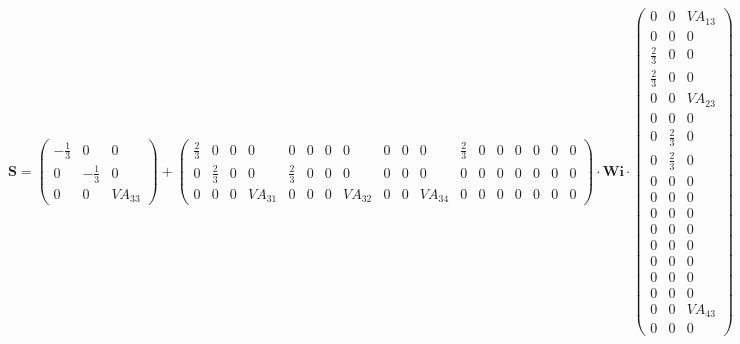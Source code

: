\[ \mathbf{S} = \left(\begin{smallmatrix} -\frac{1}{3} & 0 & 0 \\ 0 & -\frac{1}{3} & 0 \\ 0 & 0 & VA_{33} \end{smallmatrix}\right) + \left(\begin{smallmatrix} \frac{2}{3} & 0 & 0 & 0 & 0 & 0 & 0 & 0 & 0 & 0 & 0 & \frac{2}{3} & 0 & 0 & 0 & 0 & 0 & 0 \\ 0 & \frac{2}{3} & 0 & 0 & \frac{2}{3} & 0 & 0 & 0 & 0 & 0 & 0 & 0 & 0 & 0 & 0 & 0 & 0 & 0 \\ 0 & 0 & 0 & VA_{31} & 0 & 0 & 0 & VA_{32} & 0 & 0 & VA_{34} & 0 & 0 & 0 & 0 & 0 & 0 & 0 \end{smallmatrix}\right) \cdot \mathbf{Wi} \cdot\left(\begin{smallmatrix} 0 & 0 & VA_{13} \\ 0 & 0 & 0 \\ \frac{2}{3} & 0 & 0 \\ \frac{2}{3} & 0 & 0 \\ 0 & 0 & VA_{23} \\ 0 & 0 & 0 \\ 0 & \frac{2}{3} & 0 \\ 0 & \frac{2}{3} & 0 \\ 0 & 0 & 0 \\ 0 & 0 & 0 \\ 0 & 0 & 0 \\ 0 & 0 & 0 \\ 0 & 0 & 0 \\ 0 & 0 & 0 \\ 0 & 0 & 0 \\ 0 & 0 & 0 \\ 0 & 0 & VA_{43} \\ 0 & 0 & 0 \end{smallmatrix}\right) \]
